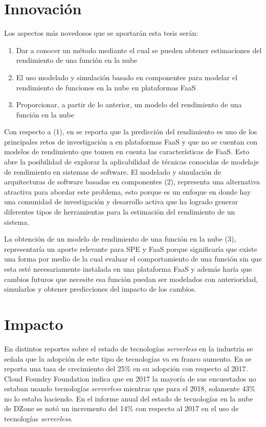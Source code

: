 \section{Innovación}
Los aspectos más novedosos que se aportarán esta tesis serán:
\begin{enumerate}
    \item Dar a conocer un método mediante el cual se pueden obtener estimaciones del rendimiento de una función en la nube
    \item El uso modelado y simulación basado en componentes para modelar el rendimiento de funciones en la nube en plataformas FaaS
    \item Proporcionar, a partir de lo anterior, un modelo del rendimiento de una función en la nube    
\end{enumerate}

Con respecto a (1), en \cite{vanEyk:2018:SRC:3185768.3186308} se reporta que la predicción del rendimiento es uno de los principales retos de investigación a en plataformas FaaS y que no se cuentan con modelos de rendimiento que tomen en cuenta las características de FaaS. Esto abre la posibilidad de explorar la aplicabilidad de técnicas conocidas de modelaje de rendimiento en sistemas de software. El modelado y simulación de arquitecturas de software basadas en componentes (2), representa una alternativa atractiva para abordar este problema, esto porque es un enfoque en donde hay una comunidad de investigación y desarrollo activa que ha logrado generar diferentes tipos de herramientas para la estimación del rendimiento de un sistema. 

La obtención de un modelo de rendimiento de una función en la nube (3), representaría un aporte relevante para SPE y FaaS porque significaría que existe una forma por medio de la cual evaluar el comportamiento de una función sin que esta esté necesariamente instalada en una plataforma FaaS y además haría que cambios futuros que necesite esa función puedan ser modelados con anterioridad, simularlos y obtener predicciones del impacto de los cambios.



\section{Impacto}
En distintos reportes sobre el estado de tecnologías \emph{serverless} en la industria \cite{dzone-cloud-2018,rightscale-2018,digital-ocean-2018,pivotal-june-2018} se señala que la adopción de este tipo de tecnologías va en franco aumento. En \cite{rightscale-2018} se reporta una tasa de crecimiento del 25\% en su adopción con respecto al 2017. Cloud Foundry Foundation \cite{pivotal-june-2018} indica que en 2017 la mayoría de sus encuestados no estaban usando tecnologías \emph{serverless} mientras que para el 2018, solamente 43\% no lo estaba haciendo. En el informe anual del estado de tecnologías en la nube de DZone\cite{dzone-cloud-2018} se notó un incremento del 14\% con respecto al 2017 en el uso de tecnologías \emph{serverless}.

